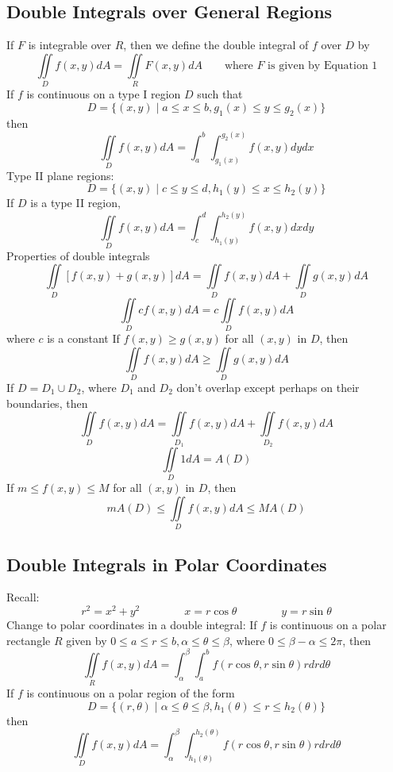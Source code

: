 \documentclass{article}
\begin{document}
    \subsection{Double Integrals over General Regions}
    \begin{outline}
        \1 If $F$ is integrable over $R$, then we define the double integral of $f$ over $D$ by \[\iint\limits_Df(x,y)dA=\iint\limits_RF(x,y)dA\qquad\text{where }F\text{ is given by Equation 1}\]
        \1 If $f$ is continuous on a type I region $D$ such that \[D=\{(x,y)\;|\;a\leq x\leq b, g_1(x)\leq y\leq g_2(x)\}\] then \[\iint\limits_Df(x,y)dA=\int^b_a\int^{g_2(x)}_{g_1(x)}f(x,y)dydx\]
        \1 Type II plane regions: \[D=\{(x,y)\;|\;c\leq y\leq d, h_1(y)\leq x\leq h_2(y)\}\]
        \1 If $D$ is a type II region, \[\iint\limits_Df(x,y)dA=\int^d_c\int^{h_2(y)}_{h_1(y)}f(x,y)dxdy\]
        \1 Properties of double integrals 
            \2 \[\iint\limits_D[f(x,y)+g(x,y)]dA=\iint\limits_Df(x,y)dA+\iint\limits_Dg(x,y)dA\]
            \2 \[\iint\limits_Dcf(x,y)dA=c\iint\limits_Df(x,y)dA\] where $c$ is a constant
            \2 If \(f(x,y)\geq g(x,y)\) for all \((x,y)\) in $D$, then \[\iint\limits_Df(x,y)dA\geq\iint\limits_Dg(x,y)dA\]
        \1 If \(D=D_1\cup D_2\), where $D_1$ and $D_2$ don't overlap except perhaps on their boundaries, then \[\iint\limits_Df(x,y)dA=\iint\limits_{D_1}f(x,y)dA+\iint\limits_{D_2}f(x,y)dA\]
        \1 \[\iint\limits_D1dA=A(D)\]
        \1 If \(m\leq f(x,y)\leq M\) for all \((x,y)\) in $D$, then \[mA(D)\leq\iint\limits_Df(x,y)dA\leq MA(D)\]
    \end{outline}
    \subsection{Double Integrals in Polar Coordinates}
    \begin{outline}
        \1 Recall: \[r^2=x^2+y^2\qquad\qquad x=r\cos\theta\qquad\qquad y=r\sin\theta\]
        \1 Change to polar coordinates in a double integral: If $f$ is continuous on a polar rectangle $R$ given by \(0\leq a\leq r\leq b,\alpha\leq\theta\leq\beta\), where \(0\leq\beta-\alpha\leq2\pi\), then \[\iint\limits_Rf(x,y)dA=\int^\beta_\alpha\int^b_af(r\cos\theta,r\sin\theta)rdrd\theta\]
        \1 If $f$ is continuous on a polar region of the form \[D=\{(r,\theta)\;|\;\alpha\leq\theta\leq\beta,h_1(\theta)\leq r\leq h_2(\theta)\}\] then \[\iint\limits_Df(x,y)dA=\int^\beta_\alpha\int^{h_2(\theta)}_{h_1(\theta)}f(r\cos\theta,r\sin\theta)rdrd\theta\]
    \end{outline}
\end{document}

